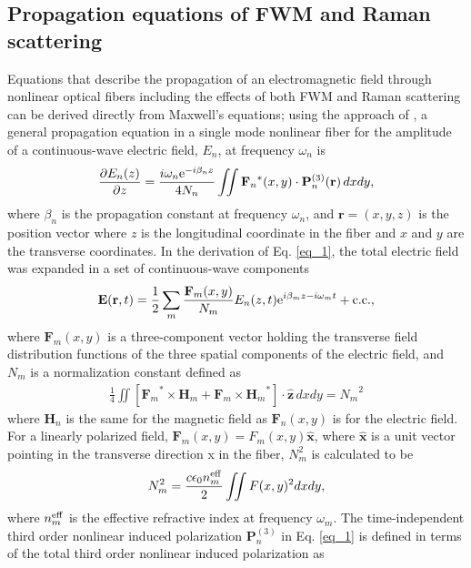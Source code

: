 \documentclass[10pt,letterpaper]{article}
\newcommand{\mb}[1]{\mathbf{#1}}
\begin{document}
\subsection{Propagation equations of FWM and Raman scattering}
Equations that describe the propagation of an electromagnetic field through nonlinear optical fibers including the effects of both FWM and Raman scattering can be derived directly from Maxwell's equations; using the approach of \cite{Kolesik2004}, a general propagation equation in a single mode nonlinear fiber for the amplitude of a continuous-wave electric field, $E_n$, at frequency $\omega_n$ is \cite{Poletti2008} 
\begin{align} \label{eq_1}
\frac{\partial E_n(z)}{\partial z} = \frac{i \omega_n{\rm e}^{ - i\beta_n z}}{4N_n} \iint {{\mb F}_n}^*(x,y) \cdot \mb{P}_n^{(3)}(\mb{r})\, dxdy,
\end{align}
where $\beta_n$ is the propagation constant at frequency $\omega_n$, and ${\mb r} = (x,y,z)$ is the position vector where $z$ is the longitudinal coordinate in the fiber and $x$ and $y$ are the transverse coordinates. In the derivation of Eq. \eqref{eq_1}, the total electric field was expanded in a set of continuous-wave components
\begin{align}
\mb{E}(\mb{r},t) = \frac{1}{2} \sum_{m} \frac{\mb{F}_m(x,y)}{N_m}E_n(z,t){\rm e}^{i\beta_m z -i\omega_m t} + {\rm c.c.},
\end{align}
where $\mb{F}_m(x,y)$ is a three-component vector holding the transverse field distribution functions of the three spatial components of the electric field, and $N_m$ is a normalization constant defined as \cite{Poletti2008}
\begin{align}
\frac{1}{4}\iint \left[ {\mb{F}_m}^* \times {\mb{H}_m} + {\mb{F}_m} \times {\mb{H}_m}^* \right ]\cdot \hat{\mb z}\, dxdy= {N_m}^2
\end{align} 
where $\mb{H}_n$ is the same for the magnetic field as $\mb{F}_n(x,y)$ is for the electric field. For a linearly polarized field, $\mb{F}_m(x,y) = F_m(x,y)\hat{\mb x}$, where $\hat{\mb x}$ is a unit vector pointing in the transverse direction x in the fiber, $N_m^2$ is calculated to be
\begin{align}\label{eq_104}
N_m^2 = \frac{c\epsilon_0 n_m^{\rm eff}}{2}\iint F(x,y)^2 dxdy,
\end{align}
where $n_m^{\rm eff}$ is the effective refractive index at frequency $\omega_m$. The time-independent third order nonlinear induced polarization $\mb{P}_n^{(3)}$ in Eq. \eqref{eq_1} is defined in terms of the total third order nonlinear induced polarization as
\end{document}
